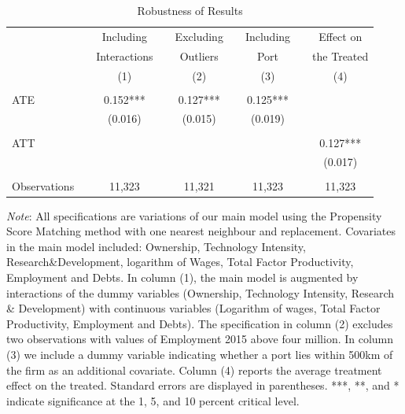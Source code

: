 \documentclass[a4paper,11pt]{scrartcl}
\begin{document}
 
\begin{table}[h]
  \centering
   \caption{Robustness of Results}
   \label{tab:robust}
\begin{threeparttable}
 
\begin{tabular}{lcccccccc} 
	\hline 
	\hline
 		&& Including & & Excluding & & Including & & Effect on \\
 		&& Interactions & & Outliers 
 		&& Port && the Treated \\
 		&& (1) && (2) && (3) && (4) \\ 
 	\hline
 		&&  &&  &&  &&  \\
ATE 	&& 0.152*** && 0.127*** && 0.125*** &&  \\
 		&& (0.016) && (0.015) && (0.019) &&  \\
 		&& &&  &&  &&  \\
ATT 	&&  &&  &&  && 0.127*** \\
 		&&  &&  &&  && (0.017) \\
 		&&  &&  &&  &&  \\
Observations && 11,323 && 11,321 && 11,323 && 11,323 \\ 
	\hline
	\hline
\end{tabular}

\begin{tablenotes}[flushleft]
     \footnotesize  
    
\item \textit{Note}: All specifications are variations of our main model using the Propensity Score Matching method with one nearest neighbour and replacement. Covariates in the main model included: Ownership, Technology Intensity, Research\&Development, logarithm of Wages, Total Factor Productivity, Employment and Debts. In column (1), the main model is augmented by interactions of the dummy variables (Ownership, Technology Intensity, Research \& Development) with continuous variables (Logarithm of wages, Total Factor Productivity, Employment and Debts).  The specification in column (2) excludes two observations with values of Employment 2015 above four million. In column (3) we include a dummy variable indicating whether a port lies within 500km of the firm as an additional covariate. Column (4) reports the average treatment effect on the treated. Standard errors are displayed in parentheses. ***, **, and * indicate significance at the 1, 5, and 10 percent critical level. 

\end{tablenotes}

\end{threeparttable}
\end{table}
\FloatBarrier
\end{document}
